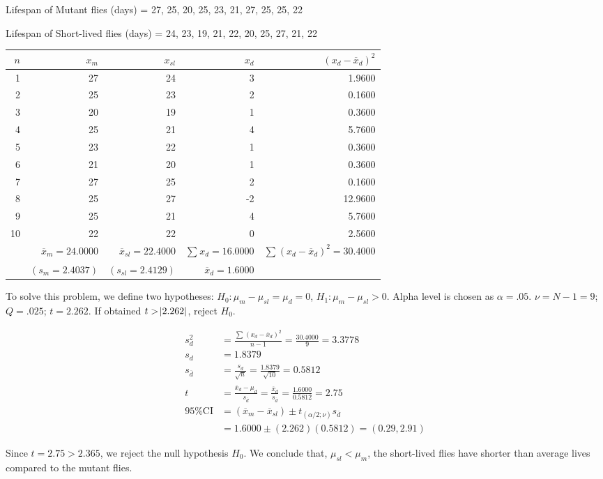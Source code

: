 \documentclass[onecolumn,10pt]{jhwhw}
\begin{document}
Lifespan of Mutant flies (days) = {27, 25, 20, 25, 23, 21, 27, 25, 25, 22}

Lifespan of Short-lived flies (days) = {24, 23, 19, 21, 22, 20, 25, 27, 21, 22}

\begin{center}
\begin{tabular}{r r r r r}
\toprule
$n$ & $x_m$ & $x_{sl}$ & $x_d$ & $(x_d - \overline{x}_d)^2$ \\
\midrule
1 & 27 & 24 & 3  &  1.9600 \\
2 & 25 & 23 & 2  &  0.1600 \\
3 & 20 & 19 & 1  &  0.3600 \\
4 & 25 & 21 & 4  &  5.7600 \\
5 & 23 & 22 & 1  &  0.3600 \\
6 & 21 & 20 & 1  &  0.3600 \\
7 & 27 & 25 & 2  &  0.1600 \\
8 & 25 & 27 & -2 & 12.9600 \\
9 & 25 & 21 & 4  &  5.7600 \\
10 & 22 & 22 & 0 &  2.5600 \\
\hline
\rule{0pt}{4ex} & $\overline{x}_m = 24.0000$ & $\overline{x}_{sl} = 22.4000$ & $\sum_{}^{} x_d = 16.0000 $ & $\sum_{}^{} (x_d - \overline{x}_d)^2 = 30.4000$ \\
\rule{0pt}{4ex}  & $(s_m = 2.4037)$ & $(s_{sl} = 2.4129)$ & $\overline{x}_d = 1.6000$ & \\
\bottomrule
\end{tabular}
\end{center}

To solve this problem, we define two hypotheses: $H_0: \mu_{m} - \mu_{sl} = \mu_d = 0$, $H_1: \mu_{m} - \mu_{sl} > 0$. Alpha level is chosen as $\alpha = .05$. $\nu = N - 1 = 9$; $Q = .025$; $t = 2.262$. If obtained $t > \abs{2.262}$, reject $H_0$.

\begin{equation*}
\begin{split}
s^2_d & = \frac{\sum_{}^{} (x_d - \overline{x}_d)^2}{n-1} = \frac{30.4000}{9} = 3.3778 \\
s_d & = 1.8379 \\
s_{\overline{d}} & = \frac{s_d}{\sqrt{n}} = \frac{1.8379}{\sqrt{10}} = 0.5812 \\
t & = \frac{\overline{x}_d - \mu_{d}}{s_{\overline{d}}} = \frac{\overline{x}_d}{s_{\overline{d}}} = \frac{1.6000}{0.5812} = 2.75\\
%
\mbox{95\% CI} & = (\overline{x}_m - \overline{x}_{sl}) \pm t_{(\alpha/2;\nu)} s_{\overline{d}} \\
& = 1.6000 \pm (2.262) (0.5812) = (0.29,2.91)
\end{split}
\end{equation*}

Since $t = 2.75 > 2.365$, we reject the null hypothesis $H_0$. We conclude that, $\mu_{sl} < \mu_{m}$, the short-lived flies have shorter than average lives compared to the mutant flies.
\end{document}
